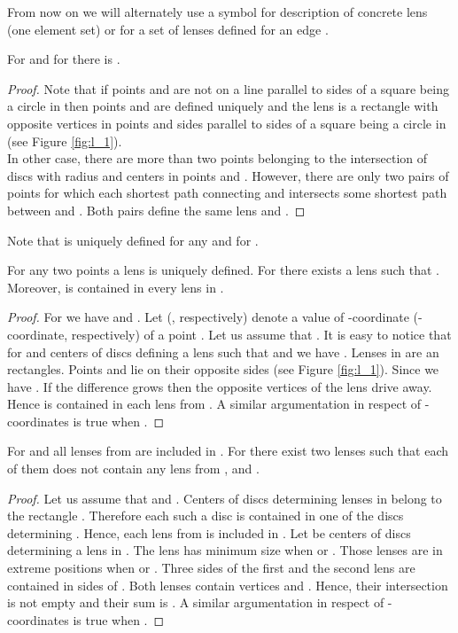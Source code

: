\documentclass[11pt]{llncs}
\begin{document}
From now on we will alternately use a symbol  for description
of concrete lens (one element set) or for a set of lenses defined for an edge . 



\begin{lemma}
\label{l1-01}
For  and for  there is .
\end{lemma}
\begin{proof}
Note that if points  and  are not on a line parallel to sides of a square being a circle 
in  then points  and  are defined uniquely and the lens  
is a rectangle with opposite vertices in points  and sides parallel to sides of a square 
being a circle in  (see Figure \ref{fig:l_1}).\\
In other case, there are more than two points belonging to the intersection of discs with radius 
 and centers in points  and . 
However, there are only two pairs of points  for which each shortest path connecting 
 and  intersects some shortest path between  and . Both pairs define 
the same lens and .   
\end{proof}


Note that  is uniquely defined for any  
and  for .\\


\begin{lemma}
\label{l1-betabig}
For any two points  a lens  is uniquely defined. 
For  there exists a lens  such that . 
Moreover,   is contained in every lens in .
\end{lemma}
\begin{proof} 
For  we have  and .
Let  (, respectively) denote a value of -coordinate (-coordinate, respectively)
of a point . Let us assume that .
It is easy to notice that for  and centers  of discs defining a lens 
 such that
 and  we have .
Lenses in  are an rectangles. Points  and  lie on their opposite sides
(see Figure \ref{fig:l_1}). Since  we have 
. If the difference  grows then 
the opposite vertices of the lens drive away. Hence  is contained in each lens 
from . A similar argumentation in respect of -coordinates is true when 
.        
\end{proof} 

\begin{lemma}
\label{l1-twolenses}
For  and  all lenses from  are
included in .
For  there exist two lenses  such that each of them 
does not contain any lens from , 
and . 
\end{lemma}
\begin{proof}
Let us assume that  and .
Centers of discs determining lenses in  belong to the rectangle 
. Therefore each such a disc is contained in one of the discs
determining . Hence, each lens from  is included 
in . 
Let  be centers of discs determining a lens in . The lens has
minimum size when  or . Those lenses are in extreme positions
when  or . Three sides of the first and the second
lens are contained in sides of . Both lenses contain vertices  and .
Hence, their intersection is not empty and their sum is . 
A similar argumentation in respect of -coordinates is true when .
\end{proof}
\end{document}
